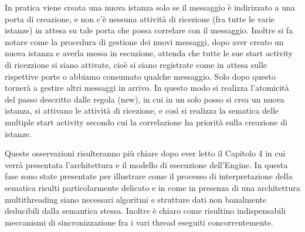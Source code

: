 In pratica viene creata una nuova istanza solo se il messaggio è indirizzato
a una porta di creazione, e non c'è nessuna attività di
ricezione (fra tutte le varie istanze) in attesa su tale porta che possa
correlare con il messaggio. Inoltre si fa notare come la procedura di gestione
dei nuovi messaggi, dopo aver creato un nuova istanza e averla messa in
escuzione, attenda che tutte le sue start activity di ricezzione si siano
attivate, cioè si siano registrate come in attesa sulle rispettive porte o
abbiamo consumato qualche messaggio. Solo dopo questo tornerà a gestire altri
messaggi in arrivo. In questo modo si realizza l'atomicità del passo descritto dalle regola (new),
in cui in un solo posso si crea un nuova istanza, si attivano le attività di
ricezione, e così si realizza la sematica delle multiple start activity secondo
cui la correlazione ha priorità sulla creazione di istanze.

Queste osservazioni risulteranno più chiare dopo ever letto il Capitolo 4 in cui
verrà presentata l'architettura e il modello di esecuzione dell'Engine. In questa
fase sono state presentate per illustrare come il processo di interpretazione
della sematica risulti particolarmente delicato e in come in presenza di una
architettura multithreading siano necessari algoritmi e strutture dati non
banalmente deducibili dalla semantica stessa. Inoltre è chiaro come risultino
indispensabili meccanismi di sincronizzazione fra i vari thread
eseguiti concorrentemente.


 


